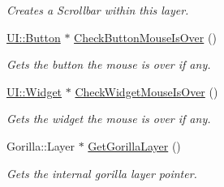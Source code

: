 \begin{DoxyCompactItemize}
\begin{DoxyCompactList}\small\item\em Creates a Scrollbar within this layer. \item\end{DoxyCompactList}\item 
\hyperlink{classphys_1_1UI_1_1Button}{UI::Button} $\ast$ \hyperlink{classphys_1_1UILayer_ac28c19dea53d2b89c5c09a2e29ce8c6d}{CheckButtonMouseIsOver} ()
\begin{DoxyCompactList}\small\item\em Gets the button the mouse is over if any. \item\end{DoxyCompactList}\item 
\hyperlink{classphys_1_1UI_1_1Widget}{UI::Widget} $\ast$ \hyperlink{classphys_1_1UILayer_ae121ca4d2ebb6fec7351a5c1eaab3dfc}{CheckWidgetMouseIsOver} ()
\begin{DoxyCompactList}\small\item\em Gets the widget the mouse is over if any. \item\end{DoxyCompactList}\item 
Gorilla::Layer $\ast$ \hyperlink{classphys_1_1UILayer_a0f1d04779794d4401714b0d8fa90cab5}{GetGorillaLayer} ()
\begin{DoxyCompactList}\small\item\em Gets the internal gorilla layer pointer. \item\end{DoxyCompactList}\end{DoxyCompactItemize}
